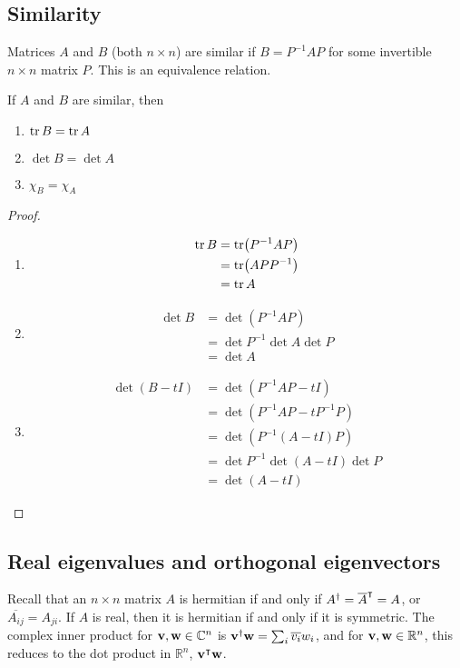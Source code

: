 \subsection{Similarity}
Matrices \(A\) and \(B\) (both \(n \times n\)) are similar if \(B = P^{-1}AP\) for some invertible \(n\times n\) matrix \(P\).
This is an equivalence relation.
\begin{proposition}
	If \(A\) and \(B\) are similar, then
	\begin{enumerate}
		\item \(\tr B = \tr A\)
		\item \(\det B = \det A\)
		\item \(\chi_B = \chi_A\)
	\end{enumerate}
\end{proposition}
\begin{proof}
	\begin{enumerate}
		\item \begin{align*}
			      \tr B & = \tr (P^{-1}AP) \\&= \tr(APP^{-1}) \\&= \tr A
		      \end{align*}
		\item \begin{align*}
			      \det B & = \det (P^{-1}AP) \\&= \det P^{-1} \det A \det P \\&= \det A
		      \end{align*}
		\item \begin{align*}
			      \det(B - tI) & = \det(P^{-1}AP - tI) \\&= \det(P^{-1}AP - tP^{-1}P) \\&= \det(P^{-1}(A - tI)P) \\&= \det P^{-1} \det(A - tI) \det P \\&= \det(A - tI)
		      \end{align*}
	\end{enumerate}
\end{proof}

\subsection{Real eigenvalues and orthogonal eigenvectors}
Recall that an \(n\times n\) matrix \(A\) is hermitian if and only if \(A^\dagger = \overline{A}^\intercal = A\), or \(\overline{A_{ij}} = A_{ji}\).
If \(A\) is real, then it is hermitian if and only if it is symmetric.
The complex inner product for \(\vb v, \vb w \in \mathbb C^n\) is \(\vb v^\dagger \vb w = \sum_i \overline{v_i}w_i\), and for \(\vb v, \vb w \in \mathbb R^n\), this reduces to the dot product in \(\mathbb R^n\), \(\vb v^\intercal \vb w\).

